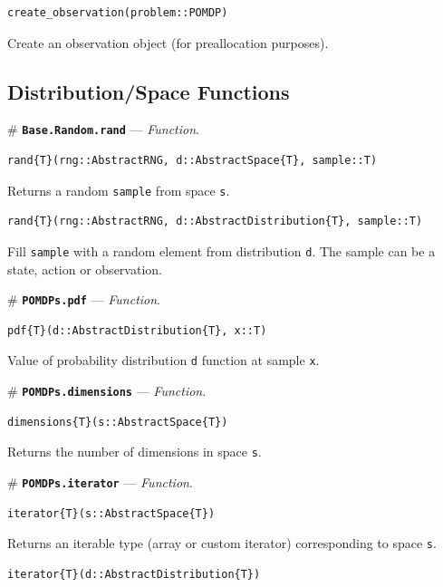 \documentclass[12pt,]{article}
\begin{document}
\begin{verbatim}
create_observation(problem::POMDP)
\end{verbatim}

Create an observation object (for preallocation purposes).

\subsection{Distribution/Space
Functions}\label{distributionspace-functions}

\# \textbf{\texttt{Base.Random.rand}} --- \emph{Function}.

\begin{verbatim}
rand{T}(rng::AbstractRNG, d::AbstractSpace{T}, sample::T)
\end{verbatim}

Returns a random \texttt{sample} from space \texttt{s}.

\begin{verbatim}
rand{T}(rng::AbstractRNG, d::AbstractDistribution{T}, sample::T)
\end{verbatim}

Fill \texttt{sample} with a random element from distribution \texttt{d}.
The sample can be a state, action or observation.

\# \textbf{\texttt{POMDPs.pdf}} --- \emph{Function}.

\begin{verbatim}
pdf{T}(d::AbstractDistribution{T}, x::T)
\end{verbatim}

Value of probability distribution \texttt{d} function at sample
\texttt{x}.

\# \textbf{\texttt{POMDPs.dimensions}} --- \emph{Function}.

\begin{verbatim}
dimensions{T}(s::AbstractSpace{T})
\end{verbatim}

Returns the number of dimensions in space \texttt{s}.

\# \textbf{\texttt{POMDPs.iterator}} --- \emph{Function}.

\begin{verbatim}
iterator{T}(s::AbstractSpace{T})
\end{verbatim}

Returns an iterable type (array or custom iterator) corresponding to
space \texttt{s}.

\begin{verbatim}
iterator{T}(d::AbstractDistribution{T})
\end{verbatim}
\end{document}
